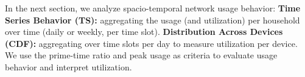 In the next section, we analyze spacio-temporal network usage behavior:
\textbf{Time Series Behavior (TS): }aggregating the usage (and utilization) per household
over time (daily or weekly, per time slot). \textbf{Distribution Across Devices (CDF): }aggregating over time slots per day to measure utilization per device. We use the prime-time ratio and peak usage
as criteria to evaluate usage behavior and interpret utilization.